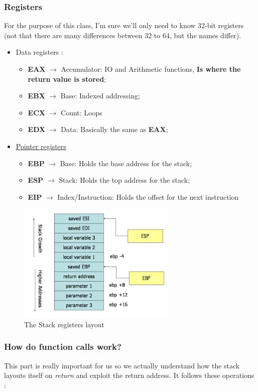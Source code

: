\documentclass[11pt]{article}
\begin{document}
{\subsubsection{Registers}
\label{sec:org3694198}
For the purpose of this class, I'm sure we'll only need to know 32-bit registers (not that there are many differences between 32 to 64, but the names differ).
\begin{itemize}
\item Data registers \cite{evans_guide_nodate}:
\begin{itemize}
\item \textbf{EAX} \(\to\) Accumulator: IO and Arithmetic functions, \textbf{Is where the return value is stored};
\item \textbf{EBX} \(\to\) Base: Indexed addressing;
\item \textbf{ECX} \(\to\) Count: Loops
\item \textbf{EDX} \(\to\) Data: Basically the same as \textbf{EAX};
\end{itemize}
\item \hyperref[StackReg]{Pointer registers}
\begin{itemize}
\item \textbf{EBP} \(\to\) Base: Holds the base address for the stack;
\item \textbf{ESP} \(\to\) Stack: Holds the top address for the stack;
\item \textbf{EIP} \(\to\) Index/Instruction: Holds the offset for the next instruction
\end{itemize}
\end{itemize}

\begin{figure}[htbp]
\centering
\includegraphics[width=3in]{res/stack-convention.png}
\caption{\label{StackReg}
The Stack registers layout}
\end{figure}

\subsubsection{How do function calls work?}
\label{sec:org88a9049}
This part is really important for us so we actually understand how the stack layouts itself on \emph{return} and exploit the return address. It follows these operations \cite{hu_understanding_nodate}:

}
\end{document}
